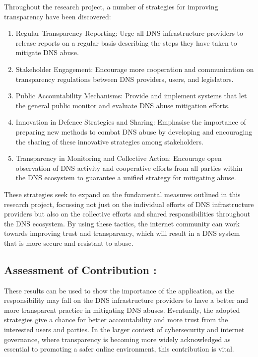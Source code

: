 Throughout the research project, a number of strategies for improving transparency have been discovered:


\begin{enumerate}

    \item Regular Transparency Reporting: Urge all DNS infrastructure providers to release reports on a regular basis describing the steps they have taken to mitigate DNS abuse.

    \item Stakeholder Engagement: Encourage more cooperation and communication on transparency regulations between DNS providers, users, and legislators.

    \item Public Accountability Mechanisms: Provide and implement systems that let the general public monitor and evaluate DNS abuse mitigation efforts.
    
    \item Innovation in Defence Strategies and Sharing: Emphasise the importance of preparing new methods to combat DNS abuse by developing and encouraging the sharing of these innovative strategies among stakeholders.
    
    \item Transparency in Monitoring and Collective Action: Encourage open observation of DNS activity and cooperative efforts from all parties within the DNS ecosystem to guarantee a unified strategy for mitigating abuse.
    
\end{enumerate}

These strategies seek to expand on the fundamental measures outlined in this research project, focussing not just on the individual efforts of DNS infrastructure providers but also on the collective efforts and shared responsibilities throughout the DNS ecosystem. By using these tactics, the internet community can work towards improving trust and transparency, which will result in a DNS system that is more secure and resistant to abuse.


\subsection{Assessment of Contribution :}

These results can be used to show the importance of the application, as the responsibility may fall on the DNS infrastructure providers to have a better and more transparent practice in mitigating DNS abuses. Eventually, the adopted strategies give a chance for better accountability and more trust from the interested users and parties. In the larger context of cybersecurity and internet governance, where transparency is becoming more widely acknowledged as essential to promoting a safer online environment, this contribution is vital.


